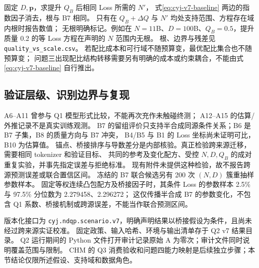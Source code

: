 固定 $D,\boldsymbol p$，求提升 $Q_B$ 后相同 Loss 所需的 $N'$，
式\eqref{eq:cyj-v7-baseline} 两边的指数因子消去，根与 B7 相同。
只有在 $Q_B+\Delta Q$ 与 $N'$ 均处支持范围、方程存在域内根时报告数值；
无根明确标记。例如在 $N=11$B、$D=100$B、$Q_B=0.5$，提升质量 0.2 的等 Loss 方程在声明的 $N$ 范围内无根。
根、边界与残差见 \texttt{quality\_vs\_scale.csv}。
若配比成本和可行域不随预算变，最优配比集合也不随预算变；
问题三出现配比结构转移需要另有明确的成本或约束耦合，不能由式\eqref{eq:cyj-v7-baseline} 自行推出。

\subsection{验证层级、识别边界与复现}

A6--A11 曾参与 Q1 模型形式比较，不能再次充作未触碰终测；
A12--A15 的估算/外推记录不是真实训练观测。
B7 的留组评价只支持半合成同源条件关系；B6 是 B7 子集，B8 的质量方向与 B7 冲突，
B4/B5 与 B1 的 Loss 坐标尚未证明可比，B10 为估算值。
锚点、桥接排序与导数差分是内部核验。真正检验跨来源迁移，需要相同 tokenizer 和验证目标、
共同的参考及变化配方、受控 $N,D,Q_B$ 的成对重复实验，并事先指定误差与拒绝标准。
现有附件未提供这种检验，故不报告跨源预测误差或联合置信区间。
冻结的 B7 联合候选另有 200 次 $(N,D)$ 簇重抽样参数样本。
固定等权连续凸包配方及桥接因子时，其条件 Loss 的参数样本 2.5\% 与 97.5\% 分位数为 2.279458、2.296272；
这仅传播半合成 B7 的参数变化，不包含 Q1 系数、桥接机制或跨源误差，不能当作联合预测区间。

版本化接口为 \texttt{cyj.ndqp.scenario.v7}，明确声明结果以桥接假设为条件，且尚未经过跨来源实证校准。
固定政策、输入哈希、环境与输出清单存于 Q2 v7 结果目录。
Q2 运行期间的 Python 文件打开审计记录原始 A 为零次；审计文件同时说明覆盖范围与限制。
CHM 的 Q3 消费验收和问题四能力映射是后续独立步骤；本节结论仅限所述假设、支持域和数据角色。

\clearpage
